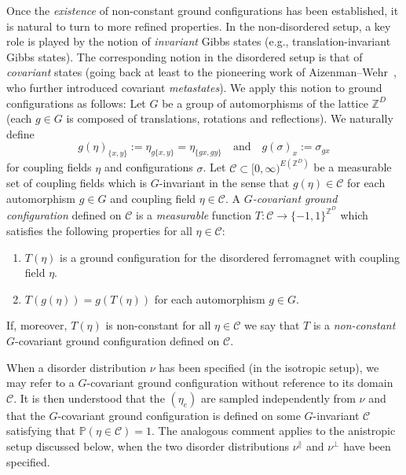 \documentclass[11pt, reqno]{amsart}
\newcommand{\Z}{\mathbb{Z}}
\renewcommand{\P}{\mathbb{P}}
\numberwithin{equation}{section}
\begin{document}
\smallskip
{}
Once the \emph{existence} of non-constant ground configurations has been established, it is natural to turn to more refined properties. In the non-disordered setup, a key role is played by the notion of \emph{invariant} Gibbs states (e.g., translation-invariant Gibbs states). The corresponding notion in the disordered setup is that of \emph{covariant} states (going back at least to the pioneering work of Aizenman--Wehr~\cite{AW90}, who further introduced covariant \emph{metastates}). We apply this notion to ground configurations as follows: 
Let $G$ be a group of automorphisms of the lattice $\Z^D$ (each $g\in G$ is composed of translations, rotations and reflections). We naturally define
\begin{equation}\label{eq:automorphism actions}
g(\eta)_{\{x,y\}} := \eta_{g\{x,y\}}=\eta_{\{gx, gy\}}\quad\text{and}\quad g(\sigma)_x:=\sigma_{gx}    
\end{equation}
for coupling fields $\eta$ and configurations $\sigma$. 
Let $\mathcal{C}\subset[0,\infty)^{E(\Z^D)}$ be a measurable set of coupling fields which is $G$-invariant in the sense that $g(\eta)\in\mathcal{C}$ for each automorphism $g\in G$ and coupling field $\eta\in\mathcal{C}$. 
A \emph{$G$-covariant ground configuration} defined on $\mathcal{C}$ is a \emph{measurable} function $T:\mathcal{C}\to\{-1,1\}^{\Z^D}$ which satisfies the following properties for all $\eta\in\mathcal{C}$:
\begin{enumerate}
\item 
$T(\eta)$ is a ground configuration for the disordered ferromagnet with coupling field $\eta$.
\item 
$T(g(\eta))=g(T(\eta))$ for each automorphism $g\in G$. 
\end{enumerate}
If, moreover, $T(\eta)$ is non-constant for all $\eta\in\mathcal{C}$ we say that $T$ is a \emph{non-constant} $G$-covariant ground configuration defined on $\mathcal{C}$.

When a disorder distribution $\nu$ has been specified (in the isotropic setup), we may refer to a $G$-covariant ground configuration without reference to its domain $\mathcal{C}$. It is then understood that the $(\eta_e)$ are sampled independently from $\nu$ and that the $G$-covariant ground configuration is defined on some $G$-invariant $\mathcal{C}$ satisfying that $\P(\eta\in\mathcal{C})=1$. The analogous comment applies to the anistropic setup discussed below, when the two disorder distributions $\nu^\parallel$ and $\nu^\perp$ have been specified.
\end{document}
